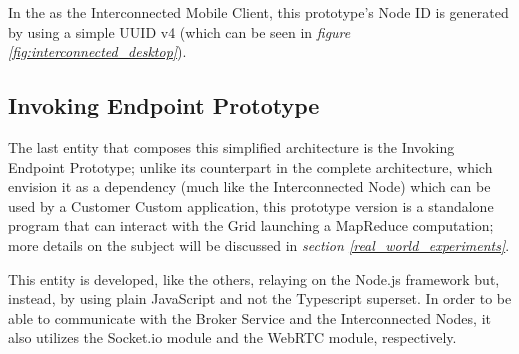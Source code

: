 In the  as the Interconnected Mobile Client, this prototype's Node ID is generated by using a simple UUID v4 (which can be seen in \textit{figure \ref{fig:interconnected_desktop}}).

\subsection{Invoking Endpoint Prototype}
The last entity that composes this simplified architecture is the Invoking Endpoint Prototype; unlike its counterpart in the complete architecture, which envision it as a dependency (much like the Interconnected Node) which can be used by a Customer Custom application, this prototype version is a standalone program that can interact with the Grid launching a MapReduce computation; more details on the subject will be discussed in \textit{section \ref{real_world_experiments}}.

This entity is developed, like the others, relaying on the Node.js framework but, instead, by using plain JavaScript and not the Typescript superset. In order to be able to communicate with the Broker Service and the Interconnected Nodes, it also utilizes the Socket.io module and the WebRTC module, respectively.